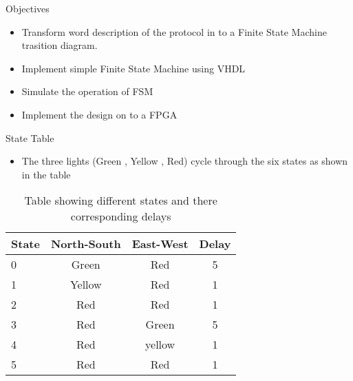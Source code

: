 \documentclass{beamer}
\begin{document}
\begin{frame}{Objectives}
  \begin{itemize}
  \item {Transform word description of the protocol in to a Finite State Machine trasition diagram. }
  \item {Implement simple Finite State Machine using VHDL}
  \item{Simulate the operation of FSM}
  \item{Implement the design on to a FPGA}
  \end{itemize}
\end{frame}



\begin{frame}{State Table}
\begin{itemize}
    \item The three lights (Green , Yellow , Red) cycle through the six states as shown in the table 
\end{itemize}

\begin{table}
\begin{tabular}{l | c | c | c }
State & North-South & East-West & Delay \\
\hline \hline
0 & Green & Red & 5 \\ 
1 & Yellow & Red & 1 \\
2 & Red & Red & 1 \\
3 & Red & Green & 5 \\ 
4 & Red & yellow & 1\\
5 & Red & Red & 1
\end{tabular}
\caption{Table showing different states and there corresponding delays}
\end{table}

\end{frame}
\end{document}
